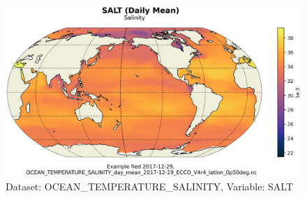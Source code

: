 \begin{figure}[H]
\centering
\includegraphics[scale=0.55]{../images/plots/latlon_plots/Ocean_Temperature_and_Salinity/SALT.png}
\caption{Dataset: OCEAN\_TEMPERATURE\_SALINITY, Variable: SALT}
\label{tab:table-OCEAN_TEMPERATURE_SALINITY_SALT-Plot}
\end{figure}
\pagebreak
